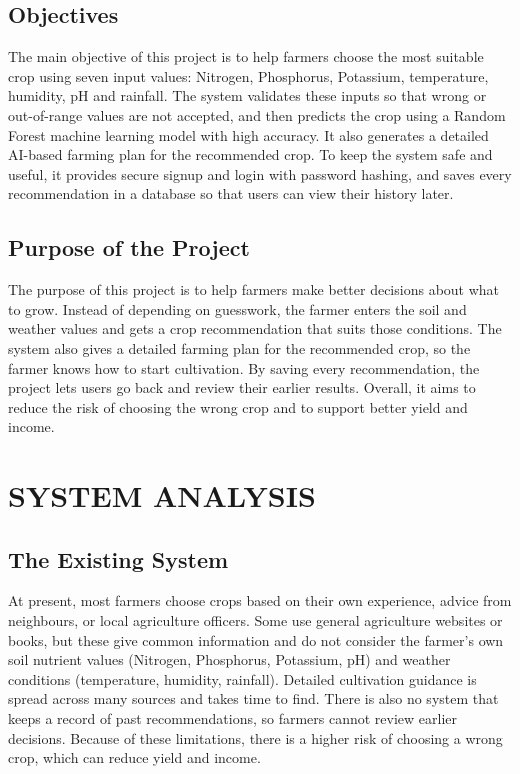 \section{Objectives}
The main objective of this project is to help farmers choose the most suitable crop using seven input values: Nitrogen, Phosphorus, Potassium, temperature, humidity, pH and rainfall. The system validates these inputs so that wrong or out-of-range values are not accepted, and then predicts the crop using a Random Forest machine learning model with high accuracy. It also generates a detailed AI-based farming plan for the recommended crop. To keep the system safe and useful, it provides secure signup and login with password hashing, and saves every recommendation in a database so that users can view their history later.
%
\section{Purpose of the Project}
The purpose of this project is to help farmers make better decisions about what to grow. Instead of depending on guesswork, the farmer enters the soil and weather values and gets a crop recommendation that suits those conditions. The system also gives a detailed farming plan for the recommended crop, so the farmer knows how to start cultivation. By saving every recommendation, the project lets users go back and review their earlier results. Overall, it aims to reduce the risk of choosing the wrong crop and to support better yield and income.
%
%
%
\chapter{SYSTEM ANALYSIS}
%
\section{The Existing System}
At present, most farmers choose crops based on their own experience, advice from neighbours, or local agriculture officers. Some use general agriculture websites or books, but these give common information and do not consider the farmer’s own soil nutrient values (Nitrogen, Phosphorus, Potassium, pH) and weather conditions (temperature, humidity, rainfall). Detailed cultivation guidance is spread across many sources and takes time to find. There is also no system that keeps a record of past recommendations, so farmers cannot review earlier decisions. Because of these limitations, there is a higher risk of choosing a wrong crop, which can reduce yield and income.	

